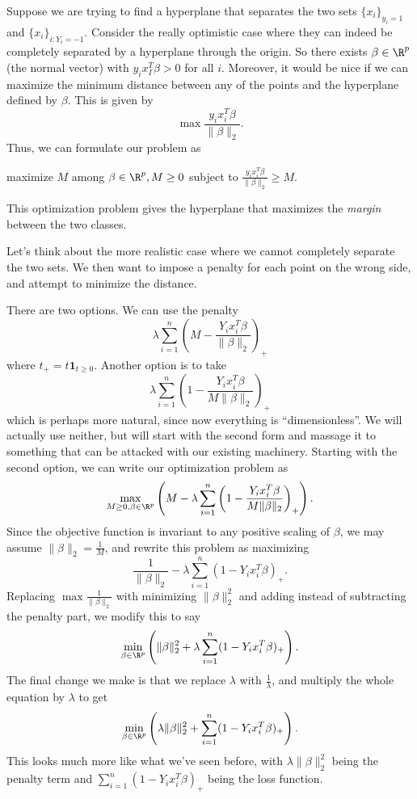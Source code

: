 \documentclass[a4paper]{article}
\begin{document}
Suppose we are trying to find a hyperplane that separates the two sets $\{x_i\}_{y_i = 1}$ and $\{x_i\}_{i: Y_i = -1}$. Consider the really optimistic case where they can indeed be completely separated by a hyperplane through the origin. So there exists $\beta \in \R^p$ (the normal vector) with $y_i x_I^T \beta> 0$ for all $i$. Moreover, it would be nice if we can maximize the minimum distance between any of the points and the hyperplane defined by $\beta$. This is given by
\[
  \max \frac{y_i x_i^T \beta}{\|\beta\|_2}.
\]
Thus, we can formulate our problem as
\begin{center}
  maximize $M$ among $\beta \in \R^p, M \geq 0$ subject to $\frac{y_i x_i^T \beta}{\|\beta\|_2} \geq M$.
\end{center}

This optimization problem gives the hyperplane that maximizes the \emph{margin} between the two classes.

Let's think about the more realistic case where we cannot completely separate the two sets. We then want to impose a penalty for each point on the wrong side, and attempt to minimize the distance.

There are two options. We can use the penalty
\[
  \lambda \sum_{i = 1}^n \left(M - \frac{Y_i x_i^T \beta}{\|\beta\|_2}\right)_+
\]
where $t_+ = t \mathbf{1}_{t \geq 0}$. Another option is to take
\[
  \lambda \sum_{i = 1}^n \left(1 - \frac{Y_i x_i^T \beta}{M \|\beta\|_2}\right)_+
\]
which is perhaps more natural, since now everything is ``dimensionless''. We will actually use neither, but will start with the second form and massage it to something that can be attacked with our existing machinery. Starting with the second option, we can write our optimization problem as
\[
  \max_{M \geq 0, \beta \in \R^p} \left(M - \lambda \sum_{i = 1}^n \left(1 - \frac{Y_i x_i^T \beta}{M \|\beta\|_2}\right)_+\right).
\]
Since the objective function is invariant to any positive scaling of $\beta$, we may assume $\|\beta\|_2 = \frac{1}{M}$, and rewrite this problem as maximizing
\[
  \frac{1}{\|\beta\|_2} - \lambda \sum_{i = 1}^n (1 - Y_i x_i^T \beta)_+.
\]
Replacing $\max \frac{1}{\|\beta\|_2}$ with minimizing $\|\beta\|_2^2$ and adding instead of subtracting the penalty part, we modify this to say
\[
  \min_{\beta \in \R^p} \left(\|\beta\|_2^2 + \lambda \sum_{i = 1}^n (1 - Y_i x_i^T \beta)_+\right).
\]
The final change we make is that we replace $\lambda$ with $\frac{1}{\lambda}$, and multiply the whole equation by $\lambda$ to get
\[
  \min_{\beta \in \R^p} \left(\lambda \|\beta\|_2^2 + \sum_{i = 1}^n (1 - Y_i x_i^T \beta)_+\right).
\]
This looks much more like what we've seen before, with $\lambda \|\beta\|_2^2$ being the penalty term and $\sum_{i = 1}^n (1 - Y_i x_i^T \beta)_+$ being the loss function.
\end{document}

